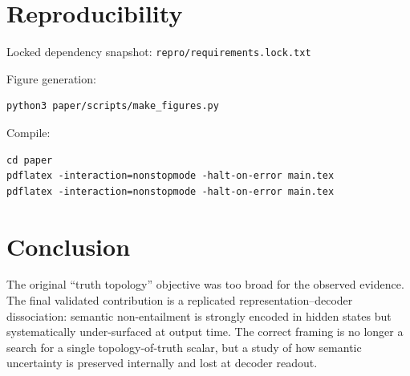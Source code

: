 \documentclass[11pt]{article}
\begin{document}
\section{Reproducibility}
Locked dependency snapshot:
\texttt{repro/requirements.lock.txt}

Figure generation:
\begin{verbatim}
python3 paper/scripts/make_figures.py
\end{verbatim}

Compile:
\begin{verbatim}
cd paper
pdflatex -interaction=nonstopmode -halt-on-error main.tex
pdflatex -interaction=nonstopmode -halt-on-error main.tex
\end{verbatim}

\section{Conclusion}
The original ``truth topology'' objective was too broad for the observed evidence.
The final validated contribution is a replicated representation--decoder dissociation:
semantic non-entailment is strongly encoded in hidden states but systematically under-surfaced at output time.
The correct framing is no longer a search for a single topology-of-truth scalar, but a study of how semantic uncertainty is preserved internally and lost at decoder readout.
\end{document}
